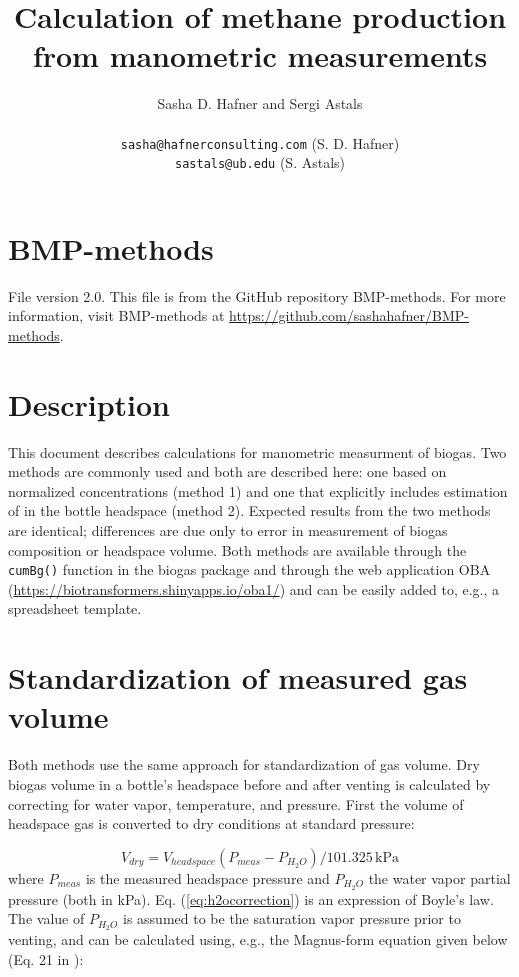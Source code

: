 \documentclass[]{article}
\title {Calculation of methane production from manometric measurements}
\author{Sasha D. Hafner and Sergi Astals\\
\\
\texttt{sasha@hafnerconsulting.com} (S. D. Hafner)\\
\texttt{sastals@ub.edu} (S. Astals)
}
\newcommand{\unit}[1]{\ensuremath{\, \mathrm{#1}}}
\begin{document}
\maketitle

\section{BMP-methods}
File version 2.0. 
This file is from the GitHub repository BMP-methods.
For more information, visit BMP-methods at \url{https://github.com/sashahafner/BMP-methods}.

\section{Description}
This document describes calculations for manometric measurment of biogas.
Two methods are commonly used and both are described here: one based on normalized  concentrations (method 1) and one that explicitly includes estimation of  in the bottle headspace (method 2).
Expected results from the two methods are identical; differences are due only to error in measurement of biogas composition or headspace volume.
Both methods are available through the \texttt{cumBg()} function in the biogas package \cite{softwarex} and through the web application OBA (\url{https://biotransformers.shinyapps.io/oba1/}) and can be easily added to, e.g., a spreadsheet template.

\section{Standardization of measured gas volume}
Both methods use the same approach for standardization of gas volume.
Dry biogas volume in a bottle's headspace before and after venting is calculated by correcting for water vapor, temperature, and pressure.
First the volume of headspace gas is converted to dry conditions at standard pressure:

\begin{equation}
  \label{eq:h2ocorrection}
  V_{dry} = V_{headspace}(P_{meas} - P_{H_2O})/101.325 \unit{kPa}
\end{equation}
where $P_{meas}$ is the measured headspace pressure and $P_{H_2O}$ the water vapor partial pressure (both in kPa).
Eq. (\ref{eq:h2ocorrection}) is an expression of Boyle's law.
The value of $P_{H_2O}$ is assumed to be the saturation vapor pressure prior to venting, and can be calculated using, e.g., the Magnus-form equation given below (Eq. 21 in \cite{magnus}):
\end{document}
